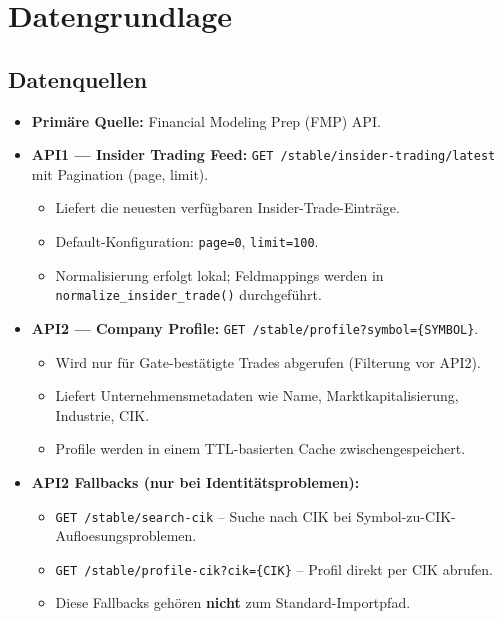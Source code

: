 \section{Datengrundlage}

\subsection{Datenquellen}
\begin{itemize}
  \item \textbf{Primäre Quelle:} Financial Modeling Prep (FMP) API. %
  \item \textbf{API1 --- Insider Trading Feed:} \texttt{GET /stable/insider-trading/latest} mit Pagination (page, limit). %
    \begin{itemize}
      \item Liefert die neuesten verfügbaren Insider-Trade-Einträge.
      \item Default-Konfiguration: \texttt{page=0}, \texttt{limit=100}. %
      \item Normalisierung erfolgt lokal; Feldmappings werden in \texttt{normalize\_insider\_trade()} durchgeführt. %
    \end{itemize}
  \item \textbf{API2 --- Company Profile:} \texttt{GET /stable/profile?symbol=\{SYMBOL\}}. %
    \begin{itemize}
      \item Wird nur für Gate-bestätigte Trades abgerufen (Filterung vor API2). %
      \item Liefert Unternehmensmetadaten wie Name, Marktkapitalisierung, Industrie, CIK.
      \item Profile werden in einem TTL-basierten Cache zwischengespeichert.
    \end{itemize}
  \item \textbf{API2 Fallbacks (nur bei Identitätsproblemen):}
    \begin{itemize}
      \item \texttt{GET /stable/search-cik} -- Suche nach CIK bei Symbol-zu-CIK-Aufloesungsproblemen.
      \item \texttt{GET /stable/profile-cik?cik=\{CIK\}} -- Profil direkt per CIK abrufen.
      \item Diese Fallbacks gehören \textbf{nicht} zum Standard-Importpfad. %
    \end{itemize}

\end{itemize}
